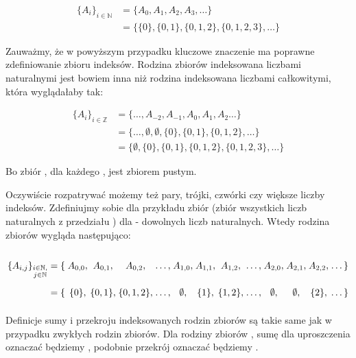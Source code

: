 \[
\begin{split}
\{ A_i \}_{i \in \mathbb{N}}
&= \{ A_0, A_1, A_2, A_3, \dots \}  
\\&= \{ \{ 0 \}, \{ 0,1 \}, \{ 0,1,2 \}, \{ 0,1,2,3 \}, \dots \} 
\end{split}
\]

Zauważmy, że w powyższym przypadku kluczowe znaczenie ma poprawne zdefiniowanie zbioru indeksów. Rodzina zbiorów  indeksowana liczbami naturalnymi jest bowiem inna niż rodzina  indeksowana liczbami całkowitymi, która wyglądałaby tak:

\[
\begin{split}
\{ A_i \}_{i \in \mathbb{Z}}
&= \{ \dots, A_{-2}, A_{-1}, A_0, A_1, A_2 \dots \}  
\\&= \{ \dots, \emptyset, \emptyset, \{ 0 \}, \{ 0,1 \}, \{ 0,1,2 \}, \dots \} 
\\&= \{ \emptyset, \{ 0 \}, \{ 0,1 \}, \{ 0,1,2 \}, \{ 0,1,2,3 \}, \dots \} 
\end{split}
\]

Bo zbiór , dla każdego , jest zbiorem pustym.

Oczywiście rozpatrywać możemy też pary, trójki, czwórki czy większe liczby indeksów. Zdefiniujmy sobie dla przykładu zbiór  (zbiór wszystkich liczb naturalnych z przedziału \m{[i,j]}) dla  - dowolnych liczb naturalnych. Wtedy rodzina zbiorów  wygląda następująco:


\[
\arraycolsep=1.4pt\def\arraystretch{2.2}
\begin{array}{llcccccccccccc}
\{A_{i,j}\}_{\substack{i \in \mathbb{N}, \\j \in \mathbb{N}}} &= \{ & A_{0,0}, & A_{0,1}, & A_{0,2}, & \dots, &  A_{1,0}, & A_{1,1}, & A_{1,2}, & \dots, & A_{2,0}, & A_{2,1}, & A_{2,2}, & \dots \} \\
&= \{ & \{ 0 \}, & \{ 0,1 \}, & \{ 0,1,2 \}, & \dots, &  \emptyset, & \{ 1 \}, & \{ 1,2 \}, & \dots, & \emptyset, & \emptyset, & \{ 2 \}, & \dots \} 
\end{array}
\]

Definicje sumy i przekroju indeksowanych rodzin zbiorów są takie same jak w przypadku zwykłych rodzin zbiorów. Dla rodziny zbiorów , sumę  dla uproszczenia oznaczać będziemy , podobnie przekrój  oznaczać będziemy .

